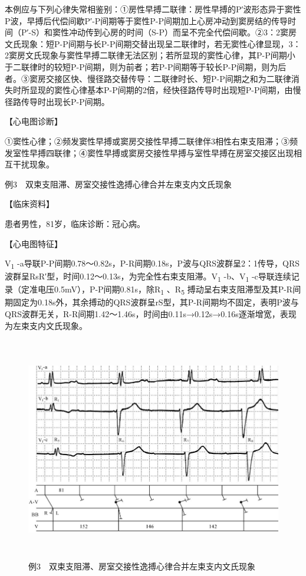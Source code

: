 本例应与下列心律失常相鉴别：①房性早搏二联律：房性早搏的P′波形态异于窦性P波，早搏后代偿间歇P′-P间期等于窦性P-P间期加上心房冲动到窦房结的传导时间（P′-S）和窦性冲动传到心房的时间（S-P）而呈不完全代偿间歇。②3：2窦房文氏现象：短P-P间期与长P-P间期交替出现呈二联律时，若无窦性心律显现，3：2窦房文氏现象与窦性早搏二联律无法区别；若所显现的窦性心律，其P-P间期小于二联律时的较短P-P间期，则为前者；若P-P间期等于较长P-P间期，则为后者。③窦房交接区快、慢径路交替传导：二联律时长、短P-P间期之和为二联律消失时所显现的窦性心律基本P-P间期的2倍，经快径路传导时出现短P-P间期，由慢径路传导时出现长P-P间期。

【心电图诊断】

①窦性心律；②频发窦性早搏或窦房交接性早搏二联律伴3相性右束支阻滞；③频发室性早搏四联律；④窦性早搏或窦房交接性早搏与室性早搏在房室交接区出现相互干扰现象。

例3　双束支阻滞、房室交接性逸搏心律合并左束支内文氏现象

【临床资料】

患者男性，81岁，临床诊断：冠心病。

【心电图特征】

V\textsubscript{1}
-a导联P-P间期0.78～0.82s，P-R间期0.18s，P波与QRS波群呈2：1传导，QRS波群呈RsR′型，时间0.12～0.13s，为完全性右束支阻滞。V\textsubscript{1}
-b、V\textsubscript{1}
-c导联连续记录（定准电压0.5mV），P-P间期0.81s，除R\textsubscript{1}
、R\textsubscript{5}
搏动呈右束支阻滞型及其P-R间期固定为0.18s外，其余搏动的QRS波群呈rS型，其P-R间期均不固定，表明P波与QRS波群无关，R-R间期1.42～1.46s，时间由0.11s→0.12s→0.16s逐渐增宽，表现为左束支内文氏现象。

\begin{figure}[!htbp]
 \centering
 \includegraphics[width=5.78125in,height=3.85417in]{./images/Image00761.jpg}
 \captionsetup{justification=centering}
 \caption{例3　双束支阻滞、房室交接性逸搏心律合并左束支内文氏现象}
 \label{fig50-3}
  \end{figure} 

